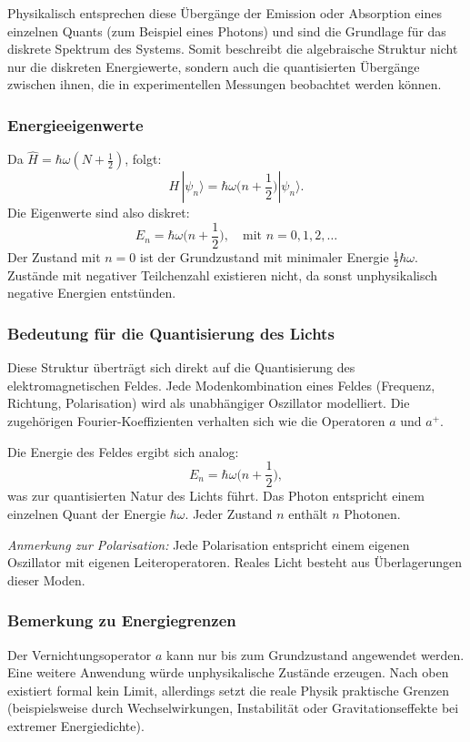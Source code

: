 Physikalisch entsprechen diese Übergänge der Emission oder Absorption eines einzelnen Quants (zum Beispiel eines Photons) und sind die Grundlage für das diskrete Spektrum des Systems.
Somit beschreibt die algebraische Struktur nicht nur die diskreten Energiewerte, sondern auch die quantisierten Übergänge zwischen ihnen, die in experimentellen Messungen beobachtet werden können.

\subsubsection{Energieeigenwerte\label{fourier:subsubsection:Energieeigenwerte}}
Da $\hat{H} = \hbar\omega(N + \frac{1}{2})$, folgt:
\begin{equation}
	H\,|\psi_n\rangle = \hbar\omega\biggl(n + \frac{1}{2}\biggr) |\psi_n\rangle.
\end{equation}
Die Eigenwerte sind also diskret:
\[
	E_n = \hbar\omega\biggl(n + \frac{1}{2}\biggr), \quad \text{mit } n = 0,1,2,\dots
\]
Der Zustand mit $n = 0$ ist der Grundzustand mit minimaler Energie $\frac{1}{2}\hbar\omega$.
Zustände mit negativer Teilchenzahl existieren nicht, da sonst unphysikalisch negative Energien entstünden.

\subsubsection{Bedeutung für die Quantisierung des Lichts\label{fourier:subsubsection:QuantisierungElmagFeld}}
Diese Struktur überträgt sich direkt auf die Quantisierung des elektromagnetischen Feldes.
Jede Modenkombination eines Feldes (Frequenz, Richtung, Polarisation) wird als unabhängiger Oszillator modelliert.
Die zugehörigen Fourier-Koeffizienten verhalten sich wie die Operatoren $a$ und $a^+$.

Die Energie des Feldes ergibt sich analog:
\[
	E_n = \hbar\omega\biggl(n + \frac{1}{2}\biggr),
\]
was zur quantisierten Natur des Lichts  führt.
Das Photon entspricht einem einzelnen Quant der Energie $\hbar\omega$.
Jeder Zustand $n$ enthält $n$ Photonen.

\textit{Anmerkung zur Polarisation:}
%
Jede Polarisation entspricht einem eigenen Oszillator mit eigenen Leiteroperatoren.
Reales Licht besteht aus Überlagerungen dieser Moden.

\subsubsection{Bemerkung zu Energiegrenzen\label{fourier:subsubsection:BemerkungBegrenztheitDerEnergie}}
Der Vernichtungsoperator $a$ kann nur bis zum Grundzustand angewendet werden.
Eine weitere Anwendung würde unphysikalische Zustände erzeugen.
Nach oben existiert formal kein Limit, allerdings setzt die reale Physik praktische Grenzen
(beispielsweise durch Wechselwirkungen, Instabilität oder Gravitationseffekte bei extremer Energiedichte).

